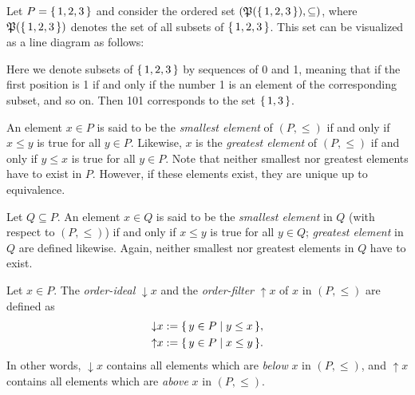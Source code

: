 \begin{Example}
  \label{expl:2}
  Let $P = {\{\, 1, 2, 3 \,\}}$ and consider the ordered set $({\mathfrak{P}({\{\,1,2,3\,\}})},
  \subseteq)$, where ${\mathfrak{P}({\{\,1,2,3\,\}})}$ denotes the set of all subsets of
  ${\{\,1,2,3\,\}}$.  This set can be visualized as a line diagram as follows:
  \begin{center}
  \end{center}
  Here we denote subsets of ${\{\,1,2,3\,\}}$ by sequences of 0 and 1, meaning that if the
  first position is 1 if and only if the number 1 is an element of the corresponding
  subset, and so on.  Then 101 corresponds to the set ${\{\,1,3\,\}}$.
\end{Example}

An element $x \in P$ is said to be the \emph{smallest element} of $(P, \le)$ if and only
if $x \le y$ is true for all $y \in P$.  Likewise, $x$ is the \emph{greatest element} of
$(P, \le)$ if and only if $y \le x$ is true for all $y \in P$.  Note that neither smallest
nor greatest elements have to exist in $P$.  However, if these elements exist, they are
unique up to equivalence.

Let $Q \subseteq P$.  An element $x \in Q$ is said to be the \emph{smallest element} in
$Q$ (with respect to $(P, \le)$) if and only if $x \le y$ is true for all $y \in Q$;
\emph{greatest element} in $Q$ are defined likewise.  Again, neither smallest nor greatest
elements in $Q$ have to exist.

Let $x \in P$.  The \emph{order-ideal} ${\downarrow}x$ and the \emph{order-filter}
${\uparrow} x$ of $x$ in $(P, \le)$ are defined as
\begin{align*}
  {\downarrow} x &:= {\{\, y \in P \mid y \le x \,\}},\\
  {\uparrow} x &:= {\{\, y \in P \mid x \le y \,\}}.
\end{align*}
In other words, ${\downarrow} x$ contains all elements which are \emph{below} $x$ in $(P,
\le)$, and ${\uparrow} x$ contains all elements which are \emph{above} $x$ in $(P, \le)$.

